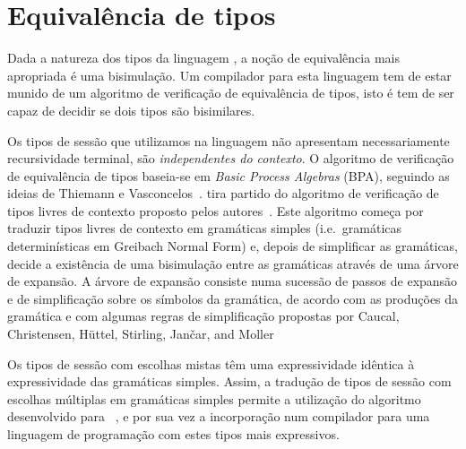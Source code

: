 \section{Equivalência de tipos}

Dada a natureza dos tipos da linguagem \mixedchoice{}, a noção de
equivalência mais apropriada é uma bisimulação.
%
Um compilador para esta linguagem tem de estar munido de um algoritmo
de verificação de equivalência de tipos, isto é tem de ser capaz de
decidir se dois tipos são bisimilares.

Os tipos de sessão que utilizamos na linguagem \mixedchoice{} não
apresentam necessariamente recursividade terminal, são
\emph{independentes do contexto}.
%
O algoritmo de verificação de equivalência de tipos baseia-se em
\emph{Basic Process Algebras} (BPA), seguindo as ideias de Thiemann e
Vasconcelos~\cite{ref-cfst}.  \mixedchoice{} tira partido do algoritmo
de verificação de tipos livres de contexto proposto pelos
autores~\cite{type-equiv}.  Este algoritmo começa por traduzir tipos
livres de contexto em gramáticas simples (i.e.\ gramáticas
determinísticas em Greibach Normal Form) e, depois de simplificar as
gramáticas, decide a existência de uma bisimulação entre as gramáticas
através de uma árvore de expansão.  A árvore de expansão consiste numa
sucessão de passos de expansão e de simplificação sobre os símbolos da
gramática, de acordo com as produções da gramática e com algumas
regras de simplificação propostas por Caucal, Christensen, H\"uttel,
Stirling, Jan\v car, and Moller
~\cite{caucal1986decidabilite,DBLP:journals/iandc/ChristensenHS95,janvcar1999techniques}

Os tipos de sessão com escolhas mistas têm uma expressividade idêntica
à expressividade das gramáticas simples. Assim, a tradução de tipos de
sessão com escolhas múltiplas em gramáticas simples permite a
utilização do algoritmo desenvolvido para \freest~\cite{type-equiv}, e
por sua vez a incorporação num compilador para uma linguagem de
programação com estes tipos mais expressivos.

